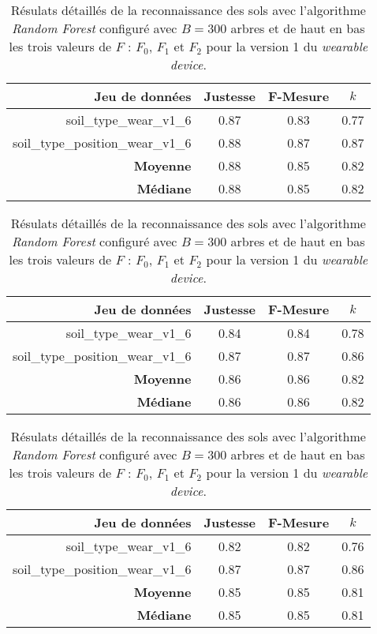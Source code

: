 \begin{table}[H]\renewcommand{\arraystretch}{0.5}
	\centering
	\caption{Résulats détaillés de la reconnaissance des sols avec l'algorithme \textit{Random Forest} configuré avec $B=300$ arbres et de haut en bas les trois valeurs de $F$ : $F_0$, $F_1$ et $F_2$ pour la version 1 du \textit{wearable device}.}
	\label{tab:rf-300-wear-v1}
	\begin{tabular}{@{}rccc@{}}
		\toprule
			\textbf{Jeu de données} & \textbf{Justesse} & \textbf{F-Mesure} & \textbf{$k$} \\
		\midrule
			soil\_type\_wear\_v1\_6 & 0.87 & 0.83 & 0.77 \\
			soil\_type\_position\_wear\_v1\_6 & 0.88 & 0.87 & 0.87 \\
			\textbf{Moyenne} & 0.88 & 0.85 & 0.82 \\
			\textbf{Médiane} & 0.88 & 0.85 & 0.82 \\
	\end{tabular}
	\begin{tabular}{@{}rccc@{}}
		\toprule
			\textbf{Jeu de données} & \textbf{Justesse} & \textbf{F-Mesure} & \textbf{$k$} \\
		\midrule
			soil\_type\_wear\_v1\_6 & 0.84 & 0.84 & 0.78 \\
			soil\_type\_position\_wear\_v1\_6 & 0.87 & 0.87 & 0.86 \\
			\textbf{Moyenne} & 0.86 & 0.86 & 0.82 \\
			\textbf{Médiane} & 0.86 & 0.86 & 0.82 \\
	\end{tabular}
	\begin{tabular}{@{}rccc@{}}
		\toprule
			\textbf{Jeu de données} & \textbf{Justesse} & \textbf{F-Mesure} & \textbf{$k$} \\
		\midrule
			soil\_type\_wear\_v1\_6 & 0.82 & 0.82 & 0.76 \\
			soil\_type\_position\_wear\_v1\_6 & 0.87 & 0.87 & 0.86 \\
			\textbf{Moyenne} & 0.85 & 0.85 & 0.81 \\
			\textbf{Médiane} & 0.85 & 0.85 & 0.81 \\
		\bottomrule
	\end{tabular}
\end{table}

